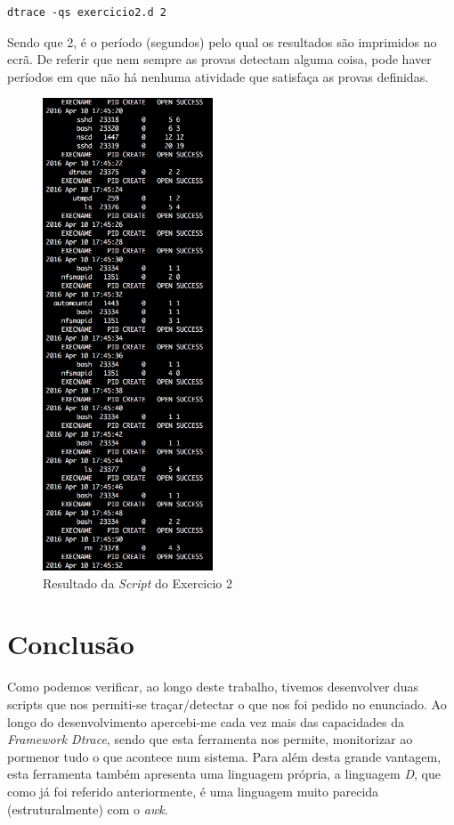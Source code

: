 \documentclass[conference,compsoc]{IEEEtran}
\begin{document}
\begin{lstlisting}
dtrace -qs exercicio2.d 2
\end{lstlisting}

Sendo que 2, é o período (segundos) pelo qual os resultados são imprimidos no ecrã. De referir que nem sempre as provas detectam alguma coisa, pode haver períodos em que não há nenhuma atividade que satisfaça as provas definidas.

\begin{figure}
\begin{center}
\includegraphics[width=0.45\textwidth]{Tables/ex2.png}
\caption{Resultado da \textit{Script} do Exercicio 2}
\label{fig:ex2}
\end{center}
\end{figure}

\section{Conclusão}
Como podemos verificar, ao longo deste trabalho, tivemos desenvolver duas scripts que nos permiti-se traçar/detectar o que nos foi pedido no enunciado. Ao longo do desenvolvimento apercebi-me cada vez mais das capacidades da \textit{Framework Dtrace}, sendo que esta ferramenta nos permite, monitorizar ao pormenor tudo o que acontece num sistema. Para além desta grande vantagem, esta ferramenta também apresenta uma linguagem própria, a linguagem \textit{D}, que como já foi referido anteriormente, é uma linguagem muito parecida (estruturalmente) com o \textit{awk}.
\end{document}
